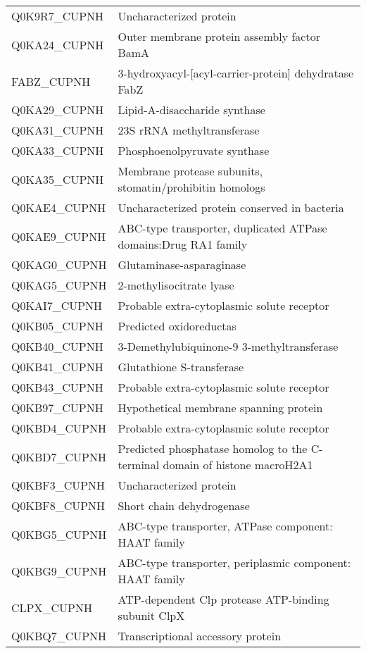 \begin{center}
\begin{longtable}{ l l }
Q0K9R7\_CUPNH & Uncharacterized protein \\ [0.5ex]
Q0KA24\_CUPNH & Outer membrane protein assembly factor BamA \\ [0.5ex]
FABZ\_CUPNH & 3-hydroxyacyl-[acyl-carrier-protein] dehydratase FabZ \\ [0.5ex]
Q0KA29\_CUPNH & Lipid-A-disaccharide synthase \\ [0.5ex]
Q0KA31\_CUPNH & 23S rRNA methyltransferase \\ [0.5ex]
Q0KA33\_CUPNH & Phosphoenolpyruvate synthase \\ [0.5ex]
Q0KA35\_CUPNH & Membrane protease subunits, stomatin/prohibitin homologs \\ [0.5ex]
Q0KAE4\_CUPNH & Uncharacterized protein conserved in bacteria \\ [0.5ex]
Q0KAE9\_CUPNH & ABC-type transporter, duplicated ATPase domains:Drug RA1 family \\ [0.5ex]
Q0KAG0\_CUPNH & Glutaminase-asparaginase \\ [0.5ex]
Q0KAG5\_CUPNH & 2-methylisocitrate lyase \\ [0.5ex]
Q0KAI7\_CUPNH & Probable extra-cytoplasmic solute receptor \\ [0.5ex]
Q0KB05\_CUPNH & Predicted oxidoreductas \\ [0.5ex]
Q0KB40\_CUPNH & 3-Demethylubiquinone-9 3-methyltransferase \\ [0.5ex]
Q0KB41\_CUPNH & Glutathione S-transferase \\ [0.5ex]
Q0KB43\_CUPNH & Probable extra-cytoplasmic solute receptor \\ [0.5ex]
Q0KB97\_CUPNH & Hypothetical membrane spanning protein \\ [0.5ex]
Q0KBD4\_CUPNH & Probable extra-cytoplasmic solute receptor \\ [0.5ex]
Q0KBD7\_CUPNH & Predicted phosphatase homolog to the C-terminal domain of histone macroH2A1 \\ [0.5ex]
Q0KBF3\_CUPNH & Uncharacterized protein \\ [0.5ex]
Q0KBF8\_CUPNH & Short chain dehydrogenase \\ [0.5ex]
Q0KBG5\_CUPNH & ABC-type transporter, ATPase component: HAAT family \\ [0.5ex]
Q0KBG9\_CUPNH & ABC-type transporter, periplasmic component: HAAT family \\ [0.5ex]
CLPX\_CUPNH & ATP-dependent Clp protease ATP-binding subunit ClpX \\ [0.5ex]
Q0KBQ7\_CUPNH & Transcriptional accessory protein \\ [0.5ex]

\end{longtable}
\end{center}
